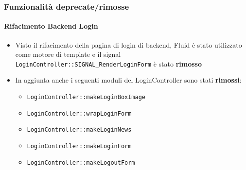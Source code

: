 \begin{frame}[fragile]
	\frametitle{Funzionalità deprecate/rimosse}
	\framesubtitle{Rifacimento Backend Login}

	\begin{itemize}

		\item Visto il rifacimento della pagina di login di backend, Fluid è stato utilizzato
			come motore di template e il signal
			\small\texttt{LoginController::SIGNAL\_RenderLoginForm}\normalsize\space
			è stato \textbf{rimosso}

		\item In aggiunta anche i seguenti moduli del LoginController sono stati \textbf{rimossi}:

			\begin{itemize}
				\item \texttt{LoginController::makeLoginBoxImage}
				\item \texttt{LoginController::wrapLoginForm}
				\item \texttt{LoginController::makeLoginNews}
				\item \texttt{LoginController::makeLoginForm}
				\item \texttt{LoginController::makeLogoutForm}
			\end{itemize}

	\end{itemize}

\end{frame}


